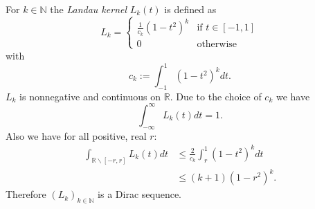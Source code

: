 \documentclass[12pt]{article}
\begin{document}
For $k\in\mathbb{N}$ the \emph{Landau kernel} $L_k(t)$ is defined as
$$L_k=\left\{\begin{array}{lr}
\frac{1}{c_k}(1-t^2)^k&\text{if }t\in[-1,1]\\
0&\text{otherwise}
\end{array}\right.$$
with
$$c_k:=\int_{-1}^1(1-t^2)^kdt.$$
$L_k$ is nonnegative and continuous on $\mathbb{R}$. Due to the choice of $c_k$ we have
$$\int_{-\infty}^\infty L_k(t)dt=1.$$
Also we have for all positive, real $r$:
\begin{align*}
\int_{\mathbb{R}\backslash[-r,r]}L_k(t)dt&\leq\frac{2}{c_k}\int_r^1(1-t^2)^kdt\\
&\leq(k+1)(1-r^2)^k.
\end{align*}
Therefore $(L_k)_{k\in\mathbb{N}}$ is a Dirac sequence.
\end{document}
